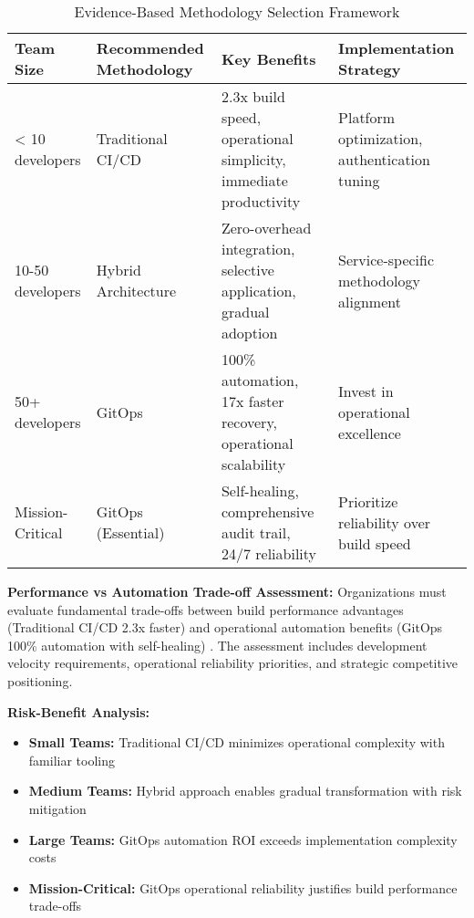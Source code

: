\begin{table}[H]
\centering
\caption{Evidence-Based Methodology Selection Framework}
\label{tab:methodology_selection_framework}
\begin{tabular}{|p{2.5cm}|p{2.8cm}|p{3.5cm}|p{4cm}|}
\hline
\textbf{Team Size} & \textbf{Recommended Methodology} & \textbf{Key Benefits} & \textbf{Implementation Strategy} \\
\hline
< 10 developers & Traditional CI/CD & 2.3x build speed, operational simplicity, immediate productivity & Platform optimization, authentication tuning \\
\hline
10-50 developers & Hybrid Architecture & Zero-overhead integration, selective application, gradual adoption & Service-specific methodology alignment \\
\hline
50+ developers & GitOps & 100\% automation, 17x faster recovery, operational scalability & Invest in operational excellence \\
\hline
Mission-Critical & GitOps (Essential) & Self-healing, comprehensive audit trail, 24/7 reliability & Prioritize reliability over build speed \\
\hline
\end{tabular}
\end{table}

\textbf{Performance vs Automation Trade-off Assessment:}
Organizations must evaluate fundamental trade-offs between build performance advantages (Traditional CI/CD 2.3x faster) and operational automation benefits (GitOps 100\% automation with self-healing) \cite{automation_vs_performance,operational_tradeoffs}. The assessment includes development velocity requirements, operational reliability priorities, and strategic competitive positioning.

\textbf{Risk-Benefit Analysis:}
\begin{itemize}
\item \textbf{Small Teams:} Traditional CI/CD minimizes operational complexity with familiar tooling \cite{small_team_practices}
\item \textbf{Medium Teams:} Hybrid approach enables gradual transformation with risk mitigation \cite{gradual_adoption_strategies}
\item \textbf{Large Teams:} GitOps automation ROI exceeds implementation complexity costs \cite{enterprise_automation_benefits}
\item \textbf{Mission-Critical:} GitOps operational reliability justifies build performance trade-offs \cite{mission_critical_systems}
\end{itemize}


